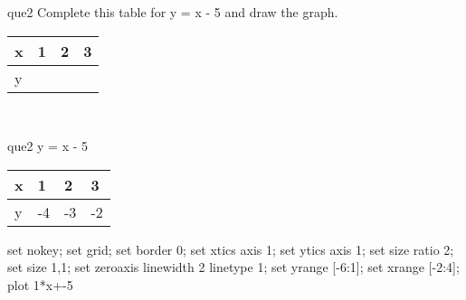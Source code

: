 \documentclass[13.5pt, varwidth=true]{beamer}
\begin{document}
\begin{frame}[shrink=19,fragile]
	\begin{beamercolorbox}[rounded=true, left, shadow=true,wd=14.8cm]{que2}
		 Complete this table for y = x - 5 and draw the graph. \\[0.3cm] \renewcommand{\arraystretch}{1.2}\begin{tabular}{|C|C|C|C|} \hline x & 1 & 2 & 3 \\ \hline y & & & \\ \hline \end{tabular}\\[0.3cm]
	\end{beamercolorbox}
\end{frame}
\begin{frame}[shrink=19,fragile]
	\begin{beamercolorbox}[rounded=true, left, shadow=true,wd=14.8cm]{que2}
		y = x - 5\renewcommand{\arraystretch}{1.2}\begin{tabular}{|C|C|C|C|} \hline x & 1 & 2 & 3 \\ \hline y & -4 & -3 & -2\\ \hline \end{tabular}\begin{gnuplot}[terminal=pdf] set nokey; set grid; set border 0; set xtics axis 1; set ytics axis 1; set size ratio 2; set size 1,1; set zeroaxis linewidth 2 linetype 1; set yrange [-6:1]; set xrange [-2:4]; plot 1*x+-5 \end{gnuplot}
	\end{beamercolorbox}
\end{frame}
\end{document}
